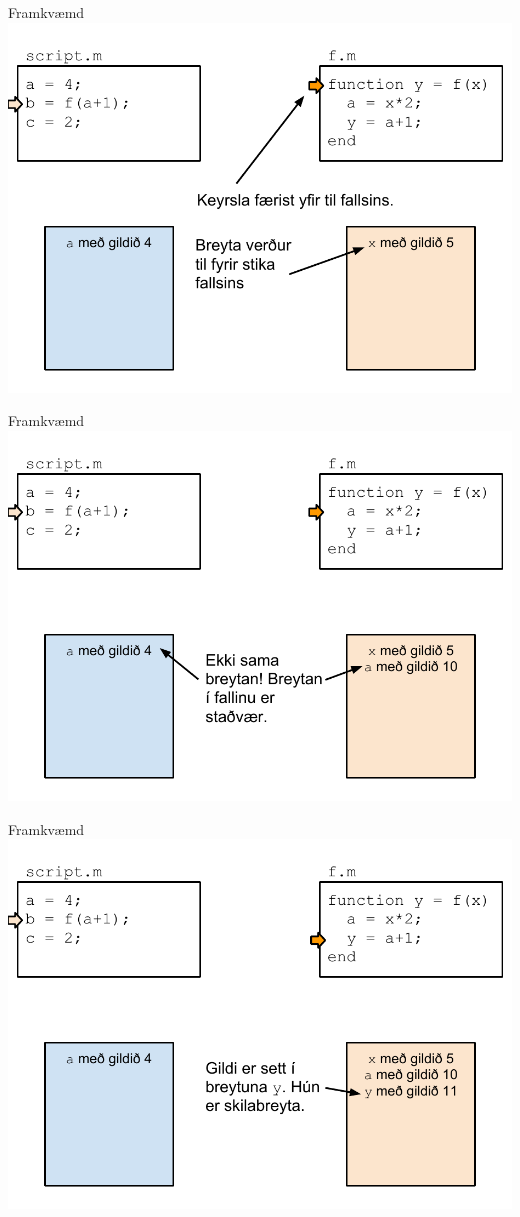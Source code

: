 \documentclass{beamer}
\begin{document}
\begin{frame}{Framkvæmd}
\includegraphics[width=\textwidth]{Pics/framkvaemd-falls-3}
\end{frame}
\begin{frame}{Framkvæmd}
\includegraphics[width=\textwidth]{Pics/framkvaemd-falls-4}
\end{frame}
\begin{frame}{Framkvæmd}
\includegraphics[width=\textwidth]{Pics/framkvaemd-falls-5}
\end{frame}
\end{document}
